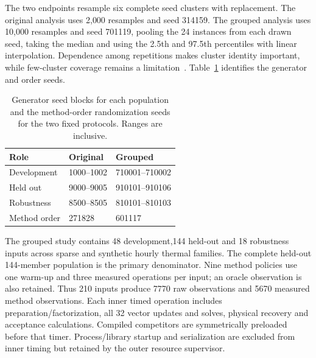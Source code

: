 The two endpoints resample six complete seed clusters with replacement.
The original analysis uses 2{,}000 resamples and seed 314159. The
grouped analysis uses 10{,}000 resamples and seed 701119, pooling the
24 instances from each drawn seed, taking the median and using the
2.5th and 97.5th percentiles with linear interpolation. Dependence
among repetitions makes cluster identity important, while few-cluster
coverage remains a limitation~\cite{efron,davison,cameron}.
Table~\ref{tab:seed-blocks} identifies the generator and order seeds.

\begin{table}[htbp]\centering\small
\caption{Generator seed blocks for each population and the method-order randomization seeds for the two fixed protocols. Ranges are inclusive.}\label{tab:seed-blocks}
\begin{tabularx}{\textwidth}{@{}lXX@{}}\toprule
Role & Original & Grouped\\\midrule
Development & 1000--1002 & 710001--710002\\
Held out & 9000--9005 & 910101--910106\\
Robustness & 8500--8505 & 810101--810103\\
Method order & 271828 & 601117\\\bottomrule
\end{tabularx}
\end{table}

The grouped study contains 48 development,144 held-out and 18 robustness
inputs across sparse and synthetic hourly thermal families. The
complete held-out 144-member population is the primary denominator.
Nine method policies use one warm-up and three measured operations
per input; an oracle observation is also retained. Thus 210 inputs
produce 7770 raw observations and 5670 measured method observations.
Each inner timed operation includes preparation/factorization,
all 32 vector updates and solves, physical recovery and acceptance
calculations. Compiled competitors are symmetrically preloaded before
that timer. Process/library startup and serialization are excluded
from inner timing but retained by the outer resource supervisor.

